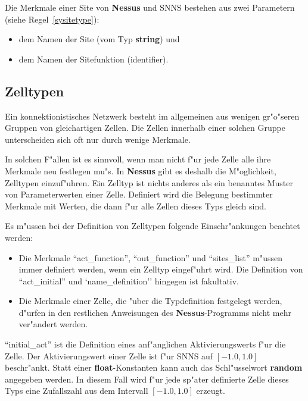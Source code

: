 Die Merkmale einer Site  von {\bf Nessus} und SNNS
bestehen aus zwei Parametern (siehe
Regel~\ref{sysitetype}):
\begin{itemize}
  \item dem Namen der Site (vom Typ {\bf string}) und
  \item dem Namen der Sitefunktion (identifier).
\end{itemize}


\subsection{Zelltypen}
\label{unitTypes}

Ein konnektionistisches Netzwerk besteht im allgemeinen aus wenigen
gr"o"seren Gruppen von gleichartigen Zellen. Die Zellen innerhalb
einer solchen Gruppe unterscheiden sich oft nur durch wenige Merkmale.

In solchen F"allen ist es sinnvoll, wenn man nicht f"ur jede Zelle
alle ihre Merkmale neu festlegen mu"s. In {\bf Nessus} gibt es deshalb
die M"oglichkeit, Zelltypen einzuf"uhren. Ein Zelltyp ist nichts
anderes als ein benanntes Muster von Parameterwerten
 einer Zelle. Definiert wird die Belegung
bestimmter Merkmale mit Werten, die dann f"ur alle Zellen dieses Typs
gleich sind.

Es m"ussen bei der Definition von Zelltypen folgende Einschr"ankungen
beachtet werden:
\begin{itemize}
  
\item Die Merkmale ``act\_function'', ``out\_function'' und
``sites\_list'' m"ussen immer definiert werden, wenn ein Zelltyp
eingef"uhrt wird. Die Definition von ``act\_initial'' und
`name\_definition'' hingegen ist fakultativ. 
  
\item Die Merkmale einer Zelle, die "uber die Typdefinition festgelegt
werden, d"urfen in den 	restlichen Anweisungen des {\bf
Nessus}-Programms nicht mehr ver"andert werden. 
\end{itemize}

``initial\_act'' ist die Definition eines anf"anglichen
Aktivierungswerts f"ur die Zelle. Der
Aktivierungswert einer Zelle ist f"ur SNNS auf $[-1.0, 1.0]$
beschr"ankt. Statt einer {\bf float}-Konstanten kann auch
das Schl"usselwort {\bf random} angegeben werden. In
diesem Fall wird f"ur jede sp"ater definierte Zelle dieses Typs eine
Zufallszahl aus dem
Intervall $[-1.0, 1.0]$ erzeugt.

